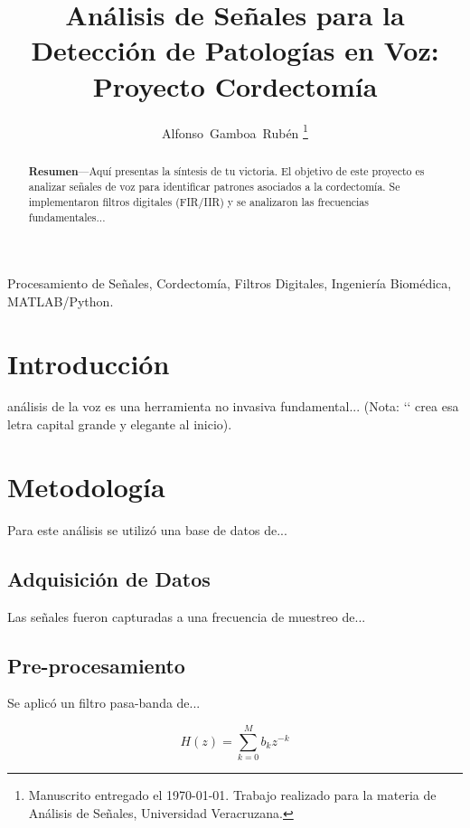 \documentclass[journal, compsoc, 12pt]{IEEEtran}
\title{Análisis de Señales para la Detección de Patologías en Voz: Proyecto Cordectomía}
\author{Alfonso~Gamboa~Rubén%
\thanks{Manuscrito entregado el \today. Trabajo realizado para la materia de Análisis de Señales, Universidad Veracruzana.}}
\begin{document}
\maketitle

\begin{abstract}
\textbf{Resumen}---Aquí presentas la síntesis de tu victoria. El objetivo de este proyecto es analizar señales de voz para identificar patrones asociados a la cordectomía. Se implementaron filtros digitales (FIR/IIR) y se analizaron las frecuencias fundamentales... 
\end{abstract}

\begin{IEEEkeywords}
Procesamiento de Señales, Cordectomía, Filtros Digitales, Ingeniería Biomédica, MATLAB/Python.
\end{IEEEkeywords}


\section{Introducción}
 análisis de la voz es una herramienta no invasiva fundamental... (Nota: `\IEEEPARstart` crea esa letra capital grande y elegante al inicio).


\section{Metodología}
Para este análisis se utilizó una base de datos de...

\subsection{Adquisición de Datos}
Las señales fueron capturadas a una frecuencia de muestreo de...

\subsection{Pre-procesamiento}
Se aplicó un filtro pasa-banda de...

\begin{equation}
    H(z) = \sum_{k=0}^{M} b_k z^{-k}
    \label{eq:filtro}
\end{equation}
\end{document}
